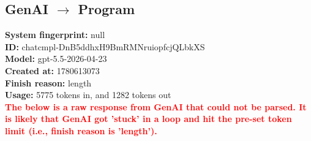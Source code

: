 \documentclass{article}
\begin{document}
\subsection*{GenAI $\rightarrow$ Program}
\textbf{System fingerprint: }null
\\\textbf{ID: }chatcmpl-DnB5ddhxH9BmRMNruiopfcjQLbkXS
\\\textbf{Model: }gpt-5.5-2026-04-23
\\\textbf{Created at: }1780613073
\\\textbf{Finish reason: }length
\\\textbf{Usage: }5775 tokens in, and 1282 tokens out
\\\textcolor{red}{\textbf{The below is a raw response from GenAI that could not be parsed. It is likely that GenAI got 'stuck' in a loop and hit the pre-set token limit (i.e., finish reason is 'length').}}
\begin{lstlisting}

\end{lstlisting}
\end{document}
